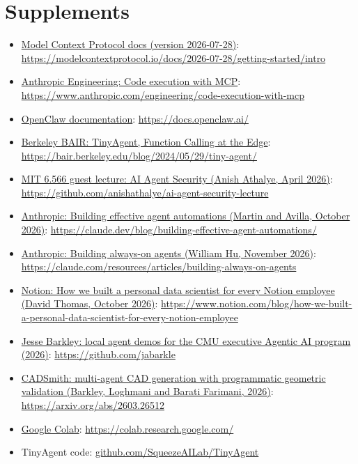 \documentclass[10pt,oneside]{report}
\begin{document}
\section{Supplements}
{\small\begin{itemize}
\item \hyperref[sup-mcp]{Model Context Protocol docs (version 2026-07-28)}: \href{https://modelcontextprotocol.io/docs/2026-07-28/getting-started/intro}{https://modelcontextprotocol.io/docs/2026-07-28/getting-started/intro}
\item \hyperref[sup-codeexec]{Anthropic Engineering: Code execution with MCP}: \href{https://www.anthropic.com/engineering/code-execution-with-mcp}{https://www.anthropic.com/engineering/code-execution-with-mcp}
\item \hyperref[sup-openclaw]{OpenClaw documentation}: \href{https://docs.openclaw.ai/}{https://docs.openclaw.ai/}
\item \hyperref[sup-tinyagent]{Berkeley BAIR: TinyAgent, Function Calling at the Edge}: \href{https://bair.berkeley.edu/blog/2024/05/29/tiny-agent/}{https://bair.berkeley.edu/blog/2024/05/29/tiny-agent/}
\item \hyperref[sup-agentsec]{MIT 6.566 guest lecture: AI Agent Security (Anish Athalye, April 2026)}: \href{https://github.com/anishathalye/ai-agent-security-lecture}{https://github.com/anishathalye/ai-agent-security-lecture}
\item \hyperref[sup-anthauto]{Anthropic: Building effective agent automations (Martin and Avilla, October 2026)}: \href{https://claude.dev/blog/building-effective-agent-automations/}{https://claude.dev/blog/building-effective-agent-automations/}
\item \hyperref[sup-alwayson]{Anthropic: Building always-on agents (William Hu, November 2026)}: \href{https://claude.com/resources/articles/building-always-on-agents}{https://claude.com/resources/articles/building-always-on-agents}
\item \hyperref[sup-notion]{Notion: How we built a personal data scientist for every Notion employee (David Thomas, October 2026)}: \href{https://www.notion.com/blog/how-we-built-a-personal-data-scientist-for-every-notion-employee}{https://www.notion.com/blog/how-we-built-a-personal-data-scientist-for-every-notion-employee}
\item \hyperref[sup-barkley]{Jesse Barkley: local agent demos for the CMU executive Agentic AI program (2026)}: \href{https://github.com/jabarkle}{https://github.com/jabarkle}
\item \hyperref[sup-cadsmith]{CADSmith: multi-agent CAD generation with programmatic geometric validation (Barkley, Loghmani and Barati Farimani, 2026)}: \href{https://arxiv.org/abs/2603.26512}{https://arxiv.org/abs/2603.26512}
\item \hyperref[sup-colab]{Google Colab}: \href{https://colab.research.google.com/}{https://colab.research.google.com/}
\item TinyAgent code: \href{https://github.com/SqueezeAILab/TinyAgent}{github.com/SqueezeAILab/TinyAgent}
\end{itemize}}
\end{document}
